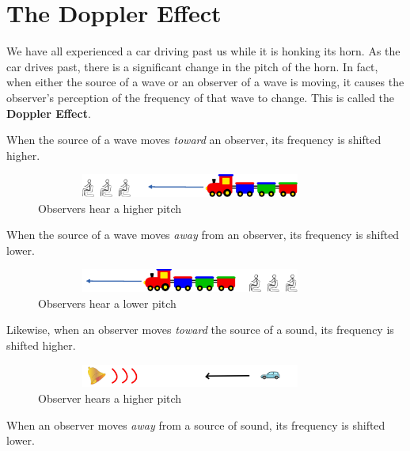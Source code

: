 		
	
	\newpage
	
	
\section{The Doppler Effect} 
	We have all experienced a car driving past us while it is honking its horn.  As the car drives past, there is a significant change in the pitch of the horn.  In fact, when either the source of a wave or an observer of a wave is moving, it causes the observer's perception of the frequency of that wave to change.  This is called the \textbf{Doppler Effect}.  
	
	When the source of a wave moves \textit{toward} an observer, its frequency is shifted higher.  
	
	\begin{figure}[h]
		\centering
		\includegraphics[height=0.3in,width=4in]{Chapters/Ch10-Waves/Doppler1.png}
		\caption{Observers hear a higher pitch}
	\end{figure}
	
	When the source of a wave moves \textit{away} from an observer, its frequency is shifted lower.  
	
		
	\begin{figure}[h]
		\centering
		\includegraphics[height=0.3in,width=4in]{Chapters/Ch10-Waves/Doppler2.png}
		\caption{Observers hear a lower pitch}
	\end{figure}
	
	Likewise, when an observer moves \textit{toward} the source of a sound, its frequency is shifted higher.
	
			
	\begin{figure}[h]
		\centering
		\includegraphics[height=0.3in,width=4in]{Chapters/Ch10-Waves/Doppler3.png}
		\caption{Observer hears a higher pitch}
	\end{figure}
	
	
	
	When an observer moves \textit{away} from a source of sound, its frequency is shifted lower.   
	
